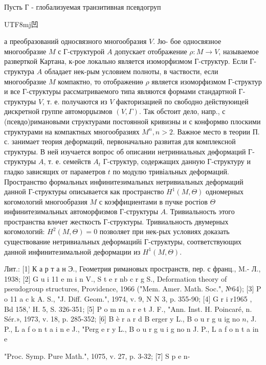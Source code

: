 \documentclass[10pt]{article}
\begin{document}
Пусть Г - глобализуемая транзитивная псевдогруп\begin{CJK}{UTF8}{mj}凹\end{CJK}а преобразований односвязного многообразия $V$. Јю- бое односвязное многообразие $M$ с Г-структурой $A$ допускает отображение $\rho: M \rightarrow V$, называемое разверткой Картана, к-рое локально является изоморфизмом Г-структур. Если Г-структура $A$ обладает нек-рым условием полноты, в частвости, если многообразие $M$ компактно, то отображениө $\rho$ является изоморфизмом Г-структур и все Г-структуры рассматриваемого типа являются формами стандартной Г-структуры $V$, т. е. получаются из $V$ факторизацией по свободно действуюицей дискретной группе автоморџызмов $(V, \Gamma)$. Так обстоит дело, напр., с (псевдо)римановыми структурами постоянной кривизны и с конформво плоскими структурами на компактных многообразиях $M^{n}, n>2$. Важное место в теории П. с. занимает теория деформаций, первоначально развитая для комплексной структуры. В ней изучается вопрос об описании нетриниальных дөформаций Г-структуры $A$, т. е. семейств $A_{t}$ Г-структур, содержащих данную Г-структуру и гладко зависящих от параметров $t$ по модулю тривіальных деформаций. Пространство формальных инфинитезимальных нетривиальных деформаций данной Г-структуры описывается как пространство $H^{1}(M, \Theta)$ одномерных когомологий многообразия $M$ с коэффициентами в пучке ростіов $\Theta$ инфинитезимальных автоморфизмов Г-структуры $A$. Тривиальность этого пространства влөчет жесткость Г-структуры. Тривиальность двумерных когомологий: $H^{2}(M, \Theta)=0$ позволяет при нек-рых условиях доказать существование нетривиальных деформацийі Г-структуры, соответствующих данной инфинитезимальной деформации из $H^{1}(M, \Theta)$.



Лит.: [1] К а р т а н Э., Геометрия римановых пространств, пер. с франц., M.- Л., 1938; [2] G u i 11 e m i n V., S t e r nb c r g S., Deformation theory of pseudogroup structures, Providence, 1966 ("Mem. Amer. Math. Soc.", №64); [3] P o 11 a c k A. S., "J. Diff. Geom.", 1974, v. 9, N N 3, p. 355-90; [4] G r i r1965 , Bd 158,' H. 5, S. 326-351; [5] P o m m a r e t J. F., "Ann. Inst. H. Poincaré, n. Sér.», 1973, v. 18, p. 285-352; [6] B è r a r d B erger y L., B o u r g u ig no $n$, J. P., L a f o n t a i n e J., "Perg e r y L., B o u r g u i g no n J. P., L a f o n t a in e

"Proc. Symp. Pure Math.", 1075, v. 27, p. 3-32; [7] S p e n-
\end{document}
